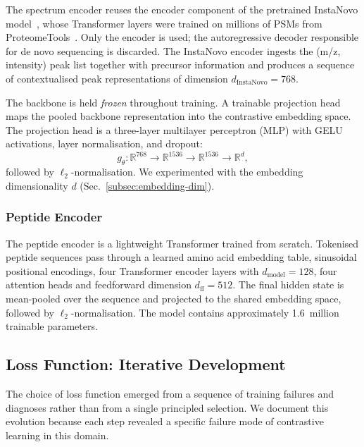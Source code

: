 \documentclass[pdflatex,sn-mathphys-num]{sn-jnl}%
\theoremstyle{thmstyleone}%
\theoremstyle{thmstyletwo}%
\theoremstyle{thmstylethree}%
\begin{document}
The spectrum encoder reuses the encoder component of the pretrained InstaNovo model~\cite{eloff2023instanovo}, whose Transformer layers were trained on millions of PSMs from ProteomeTools~\cite{zolg2017proteometools}. Only the encoder is used; the autoregressive decoder responsible for de novo sequencing is discarded. The InstaNovo encoder ingests the (m/z, intensity) peak list together with precursor information and produces a sequence of contextualised peak representations of dimension $d_\text{InstaNovo} = 768$.

The backbone is held \emph{frozen} throughout training. A trainable projection head maps the pooled backbone representation into the contrastive embedding space. The projection head is a three-layer multilayer perceptron (MLP) with GELU activations, layer normalisation, and dropout:
\begin{equation}
g_\theta : \mathbb{R}^{768} \rightarrow \mathbb{R}^{1536} \rightarrow \mathbb{R}^{1536} \rightarrow \mathbb{R}^d,
\end{equation}
followed by $\ell_2$-normalisation. We experimented with the embedding dimensionality $d$ (Sec.~\ref{subsec:embedding-dim}).

\subsubsection{Peptide Encoder}

The peptide encoder is a lightweight Transformer trained from scratch. Tokenised peptide sequences pass through a learned amino acid embedding table, sinusoidal positional encodings, four Transformer encoder layers with $d_\text{model}=128$, four attention heads and feedforward dimension $d_\text{ff}=512$. The final hidden state is mean-pooled over the sequence and projected to the shared embedding space, followed by $\ell_2$-normalisation. The model contains approximately 1.6~million trainable parameters.

\subsection{Loss Function: Iterative Development}
\label{subsec:loss}

The choice of loss function emerged from a sequence of training failures and diagnoses rather than from a single principled selection. We document this evolution because each step revealed a specific failure mode of contrastive learning in this domain.
\end{document}
